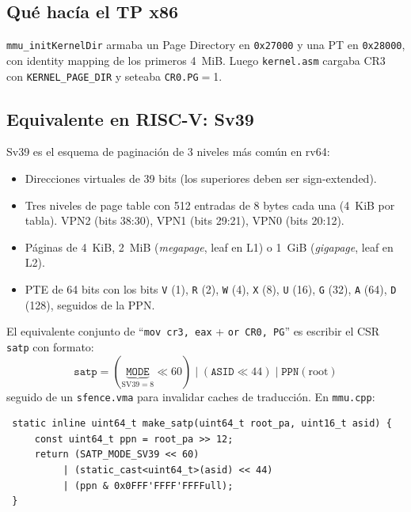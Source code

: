 \subsection{Qué hacía el TP x86}

\texttt{mmu\_initKernelDir} armaba un Page Directory en \texttt{0x27000} y una PT en \texttt{0x28000}, con identity
mapping de los primeros 4~MiB. Luego \texttt{kernel.asm} cargaba CR3 con \texttt{KERNEL\_PAGE\_DIR} y seteaba
\texttt{CR0.PG}$=$1.

\subsection{Equivalente en RISC-V: Sv39}
\label{sec:sv39}

Sv39 es el esquema de paginación de 3 niveles más común en rv64:

\begin{itemize}
  \item Direcciones virtuales de 39 bits (los superiores deben ser sign-extended).
  \item Tres niveles de page table con 512 entradas de 8 bytes cada una (4~KiB por tabla). VPN2 (bits 38:30), VPN1 (bits
  29:21), VPN0 (bits 20:12).
  \item Páginas de 4~KiB, 2~MiB (\emph{megapage}, leaf en L1) o 1~GiB (\emph{gigapage}, leaf en L2).
  \item PTE de 64 bits con los bits \texttt{V} (1), \texttt{R} (2), \texttt{W} (4), \texttt{X} (8), \texttt{U} (16),
  \texttt{G} (32), \texttt{A} (64), \texttt{D} (128), seguidos de la PPN.
\end{itemize}

El equivalente conjunto de ``\texttt{mov cr3, eax} + \texttt{or CR0, PG}'' es escribir el CSR \texttt{satp} con formato:
\[
\texttt{satp} = (\underbrace{\texttt{MODE}}_{\text{SV39}=8} \ll 60) \;|\; (\texttt{ASID} \ll 44) \;|\;
\texttt{PPN}(\text{root})
\]
seguido de un \texttt{sfence.vma} para invalidar caches de traducción. En \texttt{mmu.cpp}:

\begin{codesnippet}
\begin{verbatim}
 static inline uint64_t make_satp(uint64_t root_pa, uint16_t asid) {
     const uint64_t ppn = root_pa >> 12;
     return (SATP_MODE_SV39 << 60)
          | (static_cast<uint64_t>(asid) << 44)
          | (ppn & 0x0FFF'FFFF'FFFFull);
 }
\end{verbatim}
\end{codesnippet}

